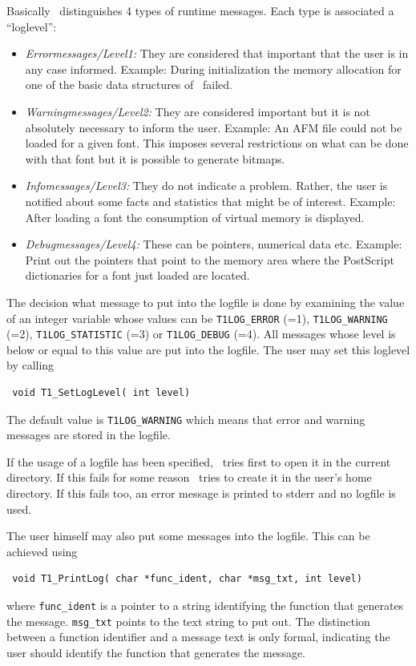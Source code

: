 Basically \tonelib\ distinguishes 4 types of runtime messages. Each type is
associated a ``loglevel'':
\begin{itemize}
\item {\sl Errormessages/Level1:}\/ They are considered that important that the user is
  in any case informed. Example: During initialization the memory allocation for
  one of the basic data structures of \tonelib\ failed.
\item {\sl Warningmessages/Level2:}\/ They are considered important but it is not
  absolutely necessary to inform the user. Example: An AFM file could not be
  loaded for a given font. This imposes several restrictions on what can be
  done with that font but it is possible to generate bitmaps.
\item {\sl Infomessages/Level3:}\/ They do not indicate a problem. Rather, the user
  is notified about some facts and statistics that might be of
  interest. Example: After loading a font the consumption of virtual memory is
  displayed. 
\item {\sl Debugmessages/Level4:}\/ These can be pointers, numerical data
  etc. Example: Print out the pointers that point to the memory area where the
  PostScript dictionaries for a font just loaded are located.
\end{itemize}
The decision what message to put into the logfile is done by examining the
value of an integer variable whose values can be \verb+T1LOG_ERROR+ (=1),
\verb+T1LOG_WARNING+ (=2), \verb+T1LOG_STATISTIC+ (=3) or \verb+T1LOG_DEBUG+
(=4). All messages whose level is below or equal to this value are put into the
logfile. The user may set this loglevel by calling
\precorr
\begin{verbatim}
 void T1_SetLogLevel( int level)
\end{verbatim}\postcorr
The default value is \verb+T1LOG_WARNING+ which means that error and warning
messages are stored in the logfile. 

If the usage of a logfile has been specified, \tonelib\ tries first to open
it in the current directory. If this fails for some reason \tonelib\ tries
to create it in the user's home directory. If this fails too, an error message
is printed to stderr and no logfile is used.

The user himself may also put some messages into the logfile. This can be
achieved using
\precorr
\begin{verbatim}
 void T1_PrintLog( char *func_ident, char *msg_txt, int level)
\end{verbatim}\postcorr
where \verb+func_ident+ is a pointer to a string identifying the function that
generates the message. \verb+msg_txt+ points to the text string to put
out. The distinction between a function identifier and a message text is only
formal, indicating the user should identify the function that generates the
message. 

